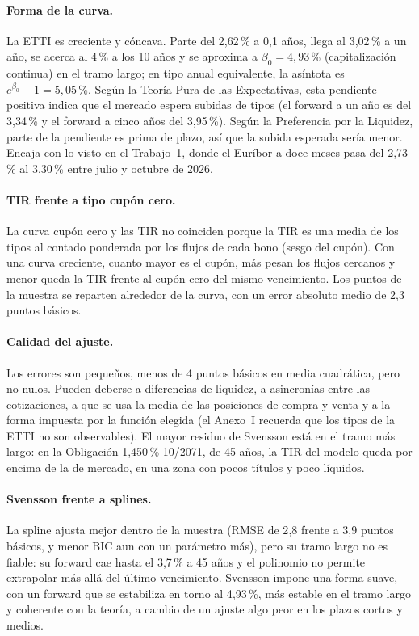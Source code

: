 \documentclass[a4paper,12pt]{article}
\begin{document}
\paragraph{Forma de la curva.} La ETTI es creciente y cóncava. Parte del 2{,}62\,\% a 0,1 años, llega al 3{,}02\,\% a un año, se acerca al 4\,\% a los 10 años y se aproxima a $\beta_0=4{,}93$\,\% (capitalización continua) en el tramo largo; en tipo anual equivalente, la asíntota es $e^{\beta_0}-1=5{,}05$\,\%. Según la Teoría Pura de las Expectativas, esta pendiente positiva indica que el mercado espera subidas de tipos (el forward a un año es del 3{,}34\,\% y el forward a cinco años del 3{,}95\,\%). Según la Preferencia por la Liquidez, parte de la pendiente es prima de plazo, así que la subida esperada sería menor. Encaja con lo visto en el Trabajo~1, donde el Euríbor a doce meses pasa del 2,73\,\% al 3,30\,\% entre julio y octubre de 2026.
\paragraph{TIR frente a tipo cupón cero.} La curva cupón cero y las TIR no coinciden porque la TIR es una media de los tipos al contado ponderada por los flujos de cada bono (sesgo del cupón). Con una curva creciente, cuanto mayor es el cupón, más pesan los flujos cercanos y menor queda la TIR frente al cupón cero del mismo vencimiento. Los puntos de la muestra se reparten alrededor de la curva, con un error absoluto medio de 2{,}3 puntos básicos.
\paragraph{Calidad del ajuste.} Los errores son pequeños, menos de 4 puntos básicos en media cuadrática, pero no nulos. Pueden deberse a diferencias de liquidez, a asincronías entre las cotizaciones, a que se usa la media de las posiciones de compra y venta y a la forma impuesta por la función elegida (el Anexo~I recuerda que los tipos de la ETTI no son observables). El mayor residuo de Svensson está en el tramo más largo: en la Obligación 1,450\,\% 10/2071, de 45 años, la TIR del modelo queda por encima de la de mercado, en una zona con pocos títulos y poco líquidos.
\paragraph{Svensson frente a splines.} La spline ajusta mejor dentro de la muestra (RMSE de 2{,}8 frente a 3{,}9 puntos básicos, y menor BIC aun con un parámetro más), pero su tramo largo no es fiable: su forward cae hasta el 3{,}7\,\% a 45 años y el polinomio no permite extrapolar más allá del último vencimiento. Svensson impone una forma suave, con un forward que se estabiliza en torno al 4{,}93\,\%, más estable en el tramo largo y coherente con la teoría, a cambio de un ajuste algo peor en los plazos cortos y medios.
\end{document}
